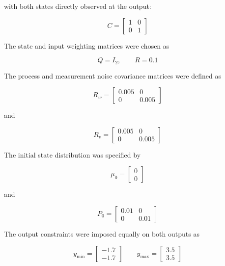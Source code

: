 with both states directly observed at the output:

\begin{equation}
    C =
    \begin{bmatrix}
        1 & 0 \\
        0 & 1
    \end{bmatrix}
\end{equation}

The state and input weighting matrices were chosen as

\begin{equation}
    Q = I_2,
    \qquad
    R = 0.1
\end{equation}

The process and measurement noise covariance matrices were defined as

\begin{equation}
    R_w =
    \begin{bmatrix}
        0.005 & 0 \\
        0 & 0.005
    \end{bmatrix}
\end{equation}

and

\begin{equation}
    R_v =
    \begin{bmatrix}
        0.005 & 0 \\
        0 & 0.005
    \end{bmatrix}
\end{equation}

The initial state distribution was specified by

\begin{equation}
    \mu_0 =
    \begin{bmatrix}
        0 \\
        0
    \end{bmatrix}
\end{equation}

and

\begin{equation}
    P_0 =
    \begin{bmatrix}
        0.01 & 0 \\
        0 & 0.01
    \end{bmatrix}
\end{equation}

The output constraints were imposed equally on both outputs as

\begin{equation}
    y_{\min}
    =
    \begin{bmatrix}
        -1.7 \\
        -1.7
    \end{bmatrix}
    \qquad
    y_{\max}
    =
    \begin{bmatrix}
        3.5 \\
        3.5
    \end{bmatrix}
\end{equation}

